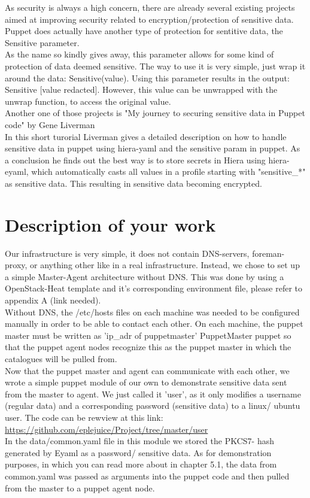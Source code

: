 As security is always a high concern, there are already several existing projects aimed at improving security related to encryption/protection of sensitive data. 
\\

Puppet does actually have another type of protection for sentitive data, the Sensitive parameter. \cite{sens}
\\
As the name so kindly gives away, this parameter allows for some kind of protection of data deemed sensitive. 
The way to use it is very simple, just wrap it around the data: Sensitive(value).
Using this parameter results in the output:
Sensitive [value redacted].
However, this value can be unwrapped with the unwrap function, to access the original value.
\\

Another one of those projects is "My journey to securing sensitive data in Puppet code" \cite{1} by Gene Liverman
\\
In this short turorial Liverman gives a detailed description on how to handle sensitive data in puppet using hiera-yaml and the sensitive param in puppet.
As a conclusion he finds out the best way is to store secrets in Hiera using hiera-eyaml, which automatically casts all values in a profile starting with "sensitive\_*" as sensitive data. This resulting in sensitive data becoming encrypted.


\section{Description of your work}

Our infrastructure is very simple, it does not contain DNS-servers, foreman-proxy, or anything other like in a real infrastructure. Instead, we chose to set up a simple Master-Agent architecture without DNS. This was done by using a OpenStack-Heat template and it's corresponding environment file, please refer to appendix A (link needed). 
\\
Without DNS, the /etc/hosts files on each machine was needed to be configured manually in order to be able to contact each other. On each machine, the puppet master must be written as 'ip\_adr of puppetmaster' PuppetMaster puppet so that the puppet agent nodes recognize this as the puppet master in which the catalogues will be pulled from.
\\
Now that the puppet master and agent can communicate with each other, we wrote a simple puppet module of our own to demonstrate sensitive data sent from the master to agent. We just called it 'user', as it only modifies a username (regular data) and a corresponding password (sensitive data) to a linux/ ubuntu user. The code can be rewview at this link: \url{https://github.com/eplejuice/Project/tree/master/user}
\\
In the data/common.yaml file in this module we stored the PKCS7- hash generated by Eyaml as a password/ sensitive data. As for demonstration purposes, in which you can read more about in chapter 5.1, the data from common.yaml was passed as arguments into the puppet code and then pulled from the master to a puppet agent node.

